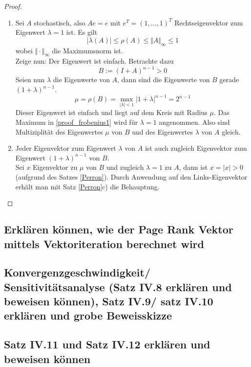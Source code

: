 \documentclass[]{article}
\begin{document}
\begin{proof}
	\begin{enumerate}
		\item
		Sei $A$ stochastisch, also $Ae = e$ mit $e^T = (1, \dotsc, 1)^T$ Rechtseigenvektor zum Eigenwert $\lambda = 1$ ist. Es gilt
		\begin{equation*}
		|\lambda(A)| \leq \rho(A) \leq \Vert A \Vert_\infty \leq 1
		\end{equation*}
		wobei $\Vert \cdot \Vert_\infty$ die Maximumsnorm ist. \\
		Zeige nun: Der Eigenwert ist einfach. Betrachte dazu
		\[ B := (I + A)^{n-1} > 0\]
		Seien nun $\lambda$ die Eigenwerte von $A$, dann sind die Eigenwerte von $B$ gerade {\nolinebreak $(1+\lambda)^{n-1}$}. \\
		\begin{equation} \label{proof_frobenius1}
		\mu = \rho(B) = \max_{|\lambda| < 1} |1+ \lambda|^{n-1} = 2^{n-1}
		\end{equation}
		Dieser Eigenwert ist einfach und liegt auf dem Kreis mit Radius $\mu$. Das Maximum in \eqref{proof_frobenius1} wird für $\lambda = 1$ angenommen. Also sind Multiziplität des Eigenwertes $\mu$ von $B$ und des Eigenwertes $\lambda$ von $A$ gleich.	
\item Jeder Eigenvektor zum Eigenwert $\lambda$ von $A$ ist auch zugleich Eigenvektor zum Eigenwert $(1 + \lambda)^{n-1}$ von $B$.\\
Sei $x$ Eigenvektor zu $\mu$ von $B$ und zugleich $\lambda=1$ zu $A$, dann ist $x = |x| > 0$ (aufgrund des Satzes \ref{Perron}). 
Durch Anwendung auf den Links-Eigenvektor erhält man mit Satz \ref{Perron}c) die Behauptung.
\end{enumerate}
\end{proof}
\subsection*{Erklären können, wie der Page Rank Vektor mittels Vektoriteration berechnet wird}

\subsection*{Konvergenzgeschwindigkeit/ Sensitivitätsanalyse (Satz IV.8 erklären und beweisen können), Satz IV.9/ satz IV.10 erklären und grobe Beweisskizze}

\subsection*{Satz IV.11 und Satz IV.12 erklären und beweisen können}
\end{document}
